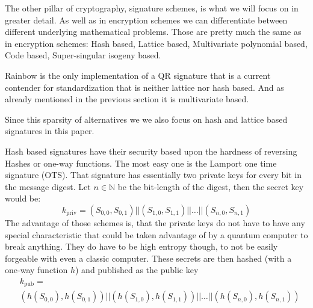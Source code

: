 \documentclass[conference]{IEEEtran}
\begin{document}
The other pillar of cryptography, signature schemes, is what we will focus on in greater detail.
As well as in encryption schemes we can differentiate between different underlying mathematical problems. Those are pretty much the same as in encryption schemes: 
Hash based,
Lattice based,
Multivariate polynomial based,
Code based,
Super-singular isogeny based.

Rainbow is the only implementation of a QR signature that is a current contender for standardization that is neither lattice nor hash based.
And as already mentioned in the previous section it is multivariate based.

Since this sparsity of alternatives we we also focus on hash and lattice based signatures in this paper.

Hash based signatures have their security based upon the hardness of reversing Hashes or one-way functions.
The most easy one is the Lamport one time signature (OTS).
That signature has essentially two private keys for every bit in the message digest. 
Let $n \in \mathbb{N}$ be the bit-length of the digest, then the secret key would be: \[k_\text{priv}= (S_{0,0},S_{0,1}) || (S_{1,0},S_{1,1})|| \dots || (S_{n,0},S_{n,1})\]
The advantage of those schemes is, that the private keys do not have to have any special characteristic that could be taken advantage of by a quantum computer to break anything.
They do have to be high entropy though, to not be easily forgeable with even a classic computer. 
These secrets are then hashed (with a one-way function $h$) and published as the public key \begin{align*}
    &k_\text{pub}= \\ &(h(S_{0,0}),h(S_{0,1})) || (h(S_{1,0}),h(S_{1,1}))|| \dots || (h(S_{n,0}),h(S_{n,1}))
\end{align*}
\end{document}
